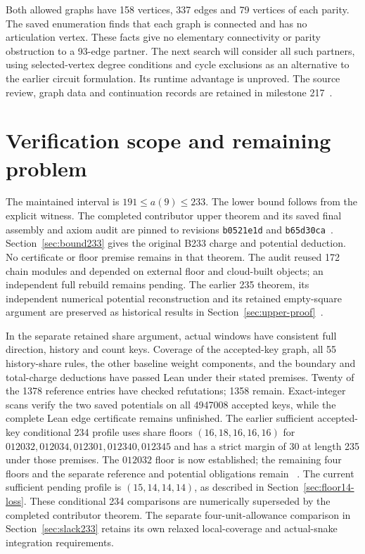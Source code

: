 \documentclass[11pt,a4paper]{article}
\theoremstyle{definition}
\theoremstyle{remark}
\begin{document}
Both allowed graphs have 158 vertices, 337 edges and 79 vertices of
each parity. The saved enumeration finds that each graph is connected
and has no articulation vertex. These facts give no elementary
connectivity or parity obstruction to a 93-edge partner. The next
search will consider all such partners, using selected-vertex degree
conditions and cycle exclusions as an alternative to the earlier
circuit formulation. Its runtime advantage is unproved.
The source review, graph data and continuation records are retained
in milestone 217~\cite{research217}.

\section{Verification scope and remaining problem}\label{sec:verification}
The maintained interval is $191\le a(9)\le233$. The lower bound follows
from the explicit witness. The completed contributor upper theorem and
its saved final assembly and axiom audit are pinned to revisions
\texttt{b0521e1d} and \texttt{b65d30ca}~\cite{bound233archive}.
Section~\ref{sec:bound233} gives the original B233 charge and potential
deduction. No certificate or floor premise remains in that theorem.
The audit reused 172 chain modules and depended on external floor and
cloud-built objects; an independent full rebuild remains pending.
The earlier 235 theorem, its independent numerical potential reconstruction
and its retained empty-square argument are preserved as historical results
in Section~\ref{sec:upper-proof}~\cite{bound235archive}.

In the separate retained share argument, actual windows have consistent full direction,
history and count keys. Coverage of the accepted-key graph, all 55
history-share rules, the other baseline weight components, and the boundary
and total-charge deductions have passed Lean under their stated premises.
Twenty of the 1378 reference entries have checked refutations; 1358 remain.
Exact-integer scans verify the two saved potentials on all 4947008 accepted
keys, while the complete Lean edge certificate remains unfinished.
The earlier sufficient accepted-key conditional 234 profile uses share floors
$(16,18,16,16,16)$ for $012032,012034,012301,012340,012345$ and has a
strict margin of 30 at length 235 under those premises. The $012032$
floor is now established; the remaining four floors and the separate
reference and potential obligations remain
~\cite{referenceunionarchive,potentialcertificatearchive,share152archive}.
The current sufficient pending profile is $(15,14,14,14)$, as described in
Section~\ref{sec:floor14-loss}. These conditional 234 comparisons are
numerically superseded by the completed contributor theorem. The separate
four-unit-allowance comparison in Section~\ref{sec:slack233} retains its
own relaxed local-coverage and actual-snake integration requirements.
\end{document}
